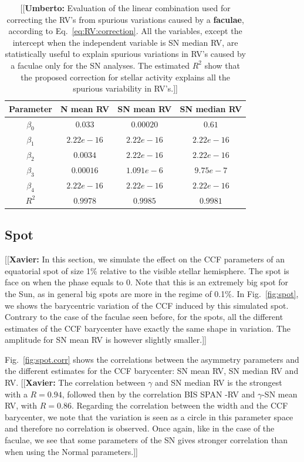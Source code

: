 \documentclass{aa}
\newcommand{\xavier}[1]{{\color{blue}[[\textbf{Xavier: }#1]]}}
\newcommand{\umberto}[1]{{\color{green}[[\textbf{Umberto: }#1]]}}
\begin{document}
\begin{table}
\centering
\begin{tabular}{|c|c|c|c|}
\hline
Parameter          & N mean RV         &   SN mean RV &   SN median RV \\
\hline
$\beta_{0}$            &    $0.033$    & $0.00020$ & $0.61$ \\
\hline
$\beta_{1}$            &    $2.22e-16 $    & $2.22e-16 $ & $2.22e-16 $ \\
\hline
$\beta_{2}$            &     $0.0034$   &  $2.22e-16 $ & $2.22e-16 $\\
\hline
$\beta_{3}$            &     $0.00016$   &  $1.091e-6$ & $9.75e-7$\\
\hline
$\beta_{4}$            &     $2.22e-16$   &  $2.22e-16$ & $2.22e-16$\\
\hline
$R^{2}$      &     $0.9978$    &  $0.9985$ & $0.9981$  \\
\hline
\end{tabular}
\caption{\umberto{Evaluation of the linear combination used for correcting the RV's from spurious variations caused by a \textbf{faculae}, according to Eq.~\ref{eq:RV:correction}. All the variables, except the intercept when the independent variable is SN median RV, are statistically useful to explain spurious variations in RV's caused by a faculae only for the SN analyses. The estimated $R^{2}$ show that the proposed correction for stellar activity explains all the spurious variability in RV's.}}
\label{table:faculae.test}
\end{table}

\subsection{Spot} \label{sec:soap.spot}

\xavier{In this section, we simulate the effect on the CCF parameters of an equatorial spot of size 1\% relative to the visible stellar hemisphere. The spot is face on when the phase equals to 0. Note that this is an extremely big spot for the Sun, as in general big spots are more in the regime of 0.1\%.
In Fig.~\ref{fig:spot}, we shows the barycentric variation of the CCF induced by this simulated spot. Contrary to the case of the faculae seen before, for the spots, all the different estimates of the CCF barycenter have exactly the same shape in variation. The amplitude for SN mean RV is however slightly smaller.} 

Fig.~\ref{fig:spot.corr} shows the correlations between the asymmetry parameters and the different estimates for the CCF barycenter: SN mean RV, SN median RV and RV. \xavier{The correlation between $\gamma$ and SN median RV is the strongest with a $R=0.94$, followed then by the correlation BIS SPAN -RV and $\gamma$-SN mean RV, with $R=0.86$. Regarding the correlation between the width and the CCF barycenter, we note that the variation is seen as a circle in this parameter space and therefore no correlation is observed. Once again, like in the case of the faculae, we see that some parameters of the SN gives stronger correlation than when using the Normal parameters.}
\end{document}
